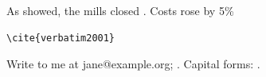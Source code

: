 \documentclass{article}
\begin{document}
As \textcite{hale2018} showed, the mills closed \parencite[p.~12]{doe.2019}.
Costs rose by 5\% \citep{energy2017} %
\begin{verbatim}
\cite{verbatim2001}
\end{verbatim}
Write to me at jane@example.org; \cites[see][]{tiny2019}[12]{last2022}.
Capital forms: \Cite{hale2018}  \Cites(see)(end){tiny2019}{last2022}.
\end{document}
